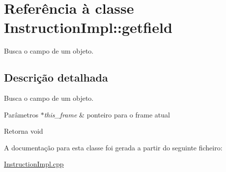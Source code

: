 \hypertarget{class_instruction_impl_1_1getfield}{}\section{Referência à classe Instruction\+Impl\+:\+:getfield}
\label{class_instruction_impl_1_1getfield}


Busca o campo de um objeto.  




\subsection{Descrição detalhada}
Busca o campo de um objeto. 


\begin{DoxyParams}{Parâmetros}
{\em $\ast$this\+\_\+frame} & ponteiro para o frame atual \\
\hline
\end{DoxyParams}
\begin{DoxyReturn}{Retorna}
void 
\end{DoxyReturn}


A documentação para esta classe foi gerada a partir do seguinte ficheiro\+:\begin{DoxyCompactItemize}
\item 
\hyperlink{_instruction_impl_8cpp}{Instruction\+Impl.\+cpp}\end{DoxyCompactItemize}
